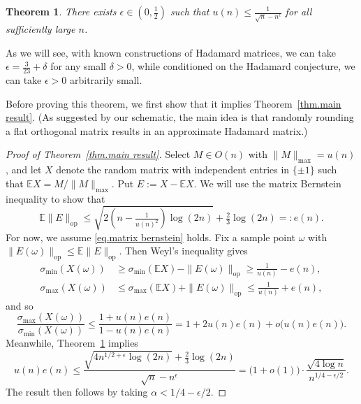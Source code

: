 \documentclass[11pt]{article}
\theoremstyle{plain}
\newtheorem{theorem}{Theorem}
\theoremstyle{definition}
\begin{document}
\begin{theorem}
\label{thm.flat orthogonal matrices}
There exists $\epsilon\in(0,\frac{1}{2})$ such that $\displaystyle u(n)\leq\frac{1}{\sqrt{n}-n^\epsilon}$ for all sufficiently large $n$.
\end{theorem}

As we will see, with known constructions of Hadamard matrices, we can take $\epsilon=\frac{3}{23}+\delta$ for any small $\delta>0$, while conditioned on the Hadamard conjecture, we can take $\epsilon>0$ arbitrarily small.

Before proving this theorem, we first show that it implies Theorem~\ref{thm.main result}.
(As suggested by our schematic, the main idea is that randomly rounding a flat orthogonal matrix results in an approximate Hadamard matrix.)

\begin{proof}[Proof of Theorem~\ref{thm.main result}]
Select $M\in O(n)$ with $\|M\|_{\max}=u(n)$, and let $X$ denote the random matrix with independent entries in $\{\pm1\}$ such that $\mathbb{E}X=M/\|M\|_{\max}$.
Put $E:=X-\mathbb{E}X$.
We will use the matrix Bernstein inequality to show that 
\begin{equation}
\label{eq.matrix bernstein}
\mathbb{E}\|E\|_{\operatorname{op}}
\leq\sqrt{2(n-\tfrac{1}{u(n)^2})\log(2n)}+\tfrac{2}{3}\log(2n)
=:e(n).
\end{equation}
For now, we assume \eqref{eq.matrix bernstein} holds.
Fix a sample point $\omega$ with $\|E(\omega)\|_{\operatorname{op}}\leq\mathbb{E}\|E\|_{\operatorname{op}}$.
Then Weyl's inequality gives
\begin{align*}
\sigma_{\min}(X(\omega))
&\geq\sigma_{\min}(\mathbb{E}X)-\|E(\omega)\|_{\operatorname{op}}
\geq\frac{1}{u(n)}-e(n)
,\\
\sigma_{\max}(X(\omega))
&\leq\sigma_{\max}(\mathbb{E}X)+\|E(\omega)\|_{\operatorname{op}}
\leq\frac{1}{u(n)}+e(n),
\end{align*}
and so
\[
\frac{\sigma_{\max}(X(\omega))}{\sigma_{\min}(X(\omega))}
\leq\frac{1+u(n)e(n)}{1-u(n)e(n)}
=1+2u(n)e(n)+o\big(u(n)e(n)\big).
\]
Meanwhile, Theorem~\ref{thm.flat orthogonal matrices} implies
\[
u(n)e(n)
\leq\frac{\sqrt{4n^{1/2+\epsilon}
\log(2n)}+\tfrac{2}{3}\log(2n)}{\sqrt{n}-n^\epsilon}
=\big(1+o(1)\big)\cdot\frac{\sqrt{4\log n}}{n^{1/4-\epsilon/2}}.
\]
The result then follows by taking $\alpha<1/4-\epsilon/2$.


\end{proof}
\end{document}
